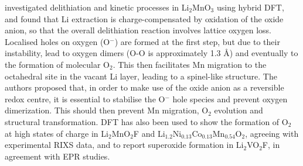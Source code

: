 \documentclass[../main.tex]{subfiles}
\begin{document}
\citeauthor{Chen2016} investigated delithiation and kinetic processes in Li$_2$MnO$_3$ using hybrid DFT, and found that Li extraction is charge-compensated by oxidation of the oxide anion, so that the overall delithiation reaction involves lattice oxygen loss.\cite{Chen2016} Localised holes on oxygen (O$^-$) are formed at the first step, but due to their instability, lead to oxygen dimers (O-O is approximately 1.3 \AA) and eventually to the formation of molecular O$_2$. This then facilitates Mn migration to the octahedral site in the vacant Li layer, leading to a spinel-like structure. The authors proposed that, in order to make use of the oxide anion as a reversible redox centre, it is essential to stabilise the O$^-$ hole species and prevent oxygen dimerization. This should then prevent Mn migration, O$_2$ evolution and structural transformation. DFT has also been used to show the formation of O$_2$ at high states of charge in Li$_2$MnO$_2$F\cite{Sharpe2020} and Li$_{1.2}$Ni$_{0.13}$Co$_{0.13}$Mn$_{0.54}$O$_2$, \cite{House2020a} agreeing with experimental RIXS data, and to report superoxide formation in Li$_2$VO$_2$F, in agreement with EPR studies.\cite{Chang2020}
\end{document}
